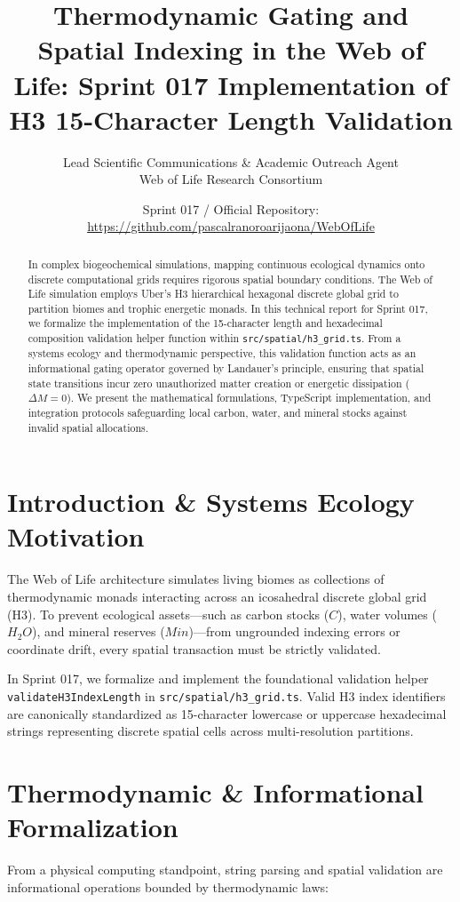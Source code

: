 \documentclass[11pt, a4paper]{article}
\title{\textbf{Thermodynamic Gating and Spatial Indexing in the Web of Life: Sprint 017 Implementation of H3 15-Character Length Validation}}
\author{Lead Scientific Communications \& Academic Outreach Agent \\ Web of Life Research Consortium}
\date{Sprint 017 / Official Repository: \url{https://github.com/pascalranoroarijaona/WebOfLife}}
\begin{document}
\maketitle

\begin{abstract}
In complex biogeochemical simulations, mapping continuous ecological dynamics onto discrete computational grids requires rigorous spatial boundary conditions. The Web of Life simulation employs Uber's H3 hierarchical hexagonal discrete global grid to partition biomes and trophic energetic monads. In this technical report for Sprint 017, we formalize the implementation of the 15-character length and hexadecimal composition validation helper function within \texttt{src/spatial/h3\_grid.ts}. From a systems ecology and thermodynamic perspective, this validation function acts as an informational gating operator governed by Landauer's principle, ensuring that spatial state transitions incur zero unauthorized matter creation or energetic dissipation ($\Delta M = 0$). We present the mathematical formulations, TypeScript implementation, and integration protocols safeguarding local carbon, water, and mineral stocks against invalid spatial allocations.
\end{abstract}

\section{Introduction \& Systems Ecology Motivation}
The Web of Life architecture simulates living biomes as collections of thermodynamic monads interacting across an icosahedral discrete global grid (H3). To prevent ecological assets---such as carbon stocks ($C$), water volumes ($H_2O$), and mineral reserves ($Min$)---from ungrounded indexing errors or coordinate drift, every spatial transaction must be strictly validated.

In Sprint 017, we formalize and implement the foundational validation helper \texttt{validateH3IndexLength} in \texttt{src/spatial/h3\_grid.ts}. Valid H3 index identifiers are canonically standardized as 15-character lowercase or uppercase hexadecimal strings representing discrete spatial cells across multi-resolution partitions.

\section{Thermodynamic \& Informational Formalization}
From a physical computing standpoint, string parsing and spatial validation are informational operations bounded by thermodynamic laws:
\end{document}
